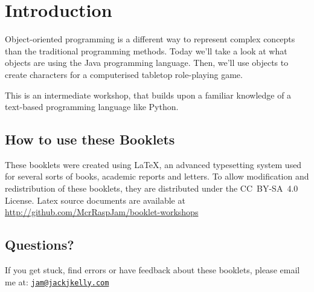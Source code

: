 \setcounter{section}{-1}
\section{Introduction}
	
	Object-oriented programming is a different way to represent complex concepts than the traditional programming methods.
	Today we'll take a look at what objects are using the Java programming language.	
	Then, we'll use objects to create characters for a computerised tabletop role-playing game.

	This is an intermediate workshop, that builds upon a familiar knowledge of a text-based programming language like Python.
		
	\subsection*{How to use these Booklets}

	
	
	
	
	
		
	These booklets were created using \textrm{\LaTeX}, an advanced typesetting system used for several sorts of books, academic reports and letters.
	To allow modification and redistribution of these booklets, they are distributed under the \hbox{CC BY-SA 4.0} License. Latex source documents are available at \url{http://github.com/McrRaspJam/booklet-workshops}
	
	
	
		
		
	\subsection*{Questions?}
		If you get stuck, find errors or have feedback about these booklets, please email me at:
		\href{mailto:jam@jackjkelly.com}{\texttt{jam@jackjkelly.com}}